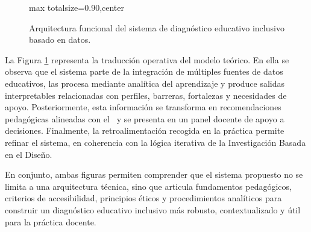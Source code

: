\begin{refsection}
\begin{figure}[p]
\begin{adjustbox}{max totalsize={\textwidth}{0.90\textheight},center}
\end{adjustbox}
\caption{Arquitectura funcional del sistema de diagnóstico educativo inclusivo basado en datos.}
\label{fig:arquitectura-funcional-diagnostico}
\end{figure}

La Figura \ref{fig:arquitectura-funcional-diagnostico} representa la traducción operativa del modelo teórico. En ella se observa que el sistema parte de la integración de múltiples fuentes de datos educativos, las procesa mediante analítica del aprendizaje y produce salidas interpretables relacionadas con perfiles, barreras, fortalezas y necesidades de apoyo. Posteriormente, esta información se transforma en recomendaciones pedagógicas alineadas con el \DUA\ y se presenta en un panel docente de apoyo a decisiones. Finalmente, la retroalimentación recogida en la práctica permite refinar el sistema, en coherencia con la lógica iterativa de la Investigación Basada en el Diseño.

En conjunto, ambas figuras permiten comprender que el sistema propuesto no se limita a una arquitectura técnica, sino que articula fundamentos pedagógicos, criterios de accesibilidad, principios éticos y procedimientos analíticos para construir un diagnóstico educativo inclusivo más robusto, contextualizado y útil para la práctica docente.

\printbibliography[heading=subbibliography,title={Referencias (Capítulo II)}]

\end{refsection}